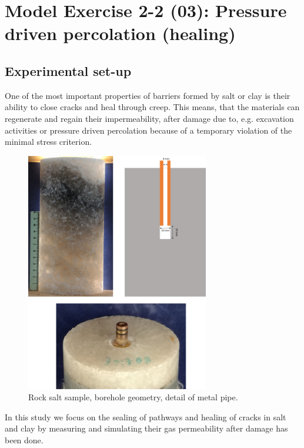 \section{Model Exercise 2-2 (03): Pressure driven percolation (healing)}
\label{sec:mex03}
\subsection{Experimental set-up}
One of the most important properties of barriers formed by salt or clay is their ability to close cracks and heal through creep. This means, that the materials can regenerate and regain their impermeability, after damage due to, e.g. excavation activities or  pressure driven percolation because of a temporary violation of the minimal stress criterion.

\begin{figure}[!ht]
\centering
\includegraphics[width=8cm]{figures/mex3-exper-setup.png}
\caption{Rock salt sample, borehole geometry, detail of metal pipe.}
\label{fig:ME3-exper-setup}
\end{figure}

In this study we focus on the sealing of pathways and healing of cracks in salt and clay by measuring and simulating their gas permeability after damage has been done. 

